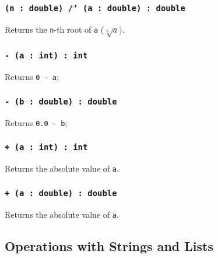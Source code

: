 \subsubsection{\texttt{(n : double) /' (a : double) : double}}

Returns the \texttt{n}-th root of \texttt{a} ($\sqrt[n]{a}$).


\subsubsection{\texttt{- (a : int) : int}}

Returns \texttt{0 - a};

\subsubsection{\texttt{- (b : double) : double}}

Returns \texttt{0.0 - b};

\subsubsection{\texttt{+ (a : int) : int}}

Returns the absolute value of \texttt{a}.

\subsubsection{\texttt{+ (a : double) : double}}

Returns the absolute value of \texttt{a}.

\subsection{Operations with Strings and Lists}

